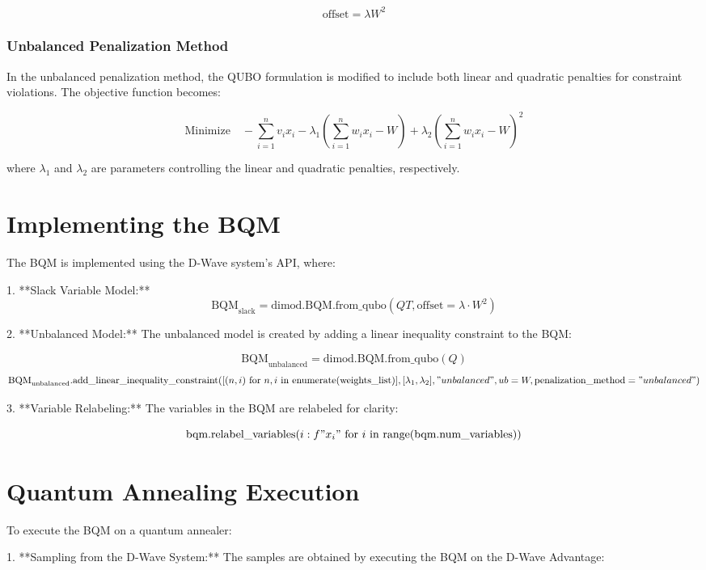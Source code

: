 \documentclass{article}
\begin{document}
\[
\text{offset} = \lambda W^2
\]

\subsubsection{Unbalanced Penalization Method}

In the unbalanced penalization method, the QUBO formulation is modified to include both linear and quadratic penalties for constraint violations. The objective function becomes:

\[
\text{Minimize} \quad -\sum_{i=1}^{n} v_i x_i - \lambda_1 \left( \sum_{i=1}^{n} w_i x_i - W \right) + \lambda_2 \left( \sum_{i=1}^{n} w_i x_i - W \right)^2
\]

where \( \lambda_1 \) and \( \lambda_2 \) are parameters controlling the linear and quadratic penalties, respectively.

\section{Implementing the BQM}

The BQM is implemented using the D-Wave system's API, where:

1. **Slack Variable Model:**
   \[
   \text{BQM}_{\text{slack}} = \text{dimod.BQM.from\_qubo}(QT, \text{offset}=\lambda \cdot W^2)
   \]

2. **Unbalanced Model:**
   The unbalanced model is created by adding a linear inequality constraint to the BQM:

   \[
   \text{BQM}_{\text{unbalanced}} = \text{dimod.BQM.from\_qubo}(Q)
   \]
   \[
   \text{BQM}_{\text{unbalanced}}.\text{add\_linear\_inequality\_constraint}(
   [(n, i) \text{ for } n, i \text{ in enumerate(weights\_list)}],
   [\lambda_1, \lambda_2], "unbalanced", ub=W, \text{penalization\_method}="unbalanced"
   )
   \]

3. **Variable Relabeling:**
   The variables in the BQM are relabeled for clarity:

   \[
   \text{bqm}.\text{relabel\_variables}({i: f"x_{i}" \text{ for } i \text{ in range(bqm.num\_variables)}})
   \]

\section{Quantum Annealing Execution}

To execute the BQM on a quantum annealer:

1. **Sampling from the D-Wave System:**
   The samples are obtained by executing the BQM on the D-Wave Advantage:
\end{document}
